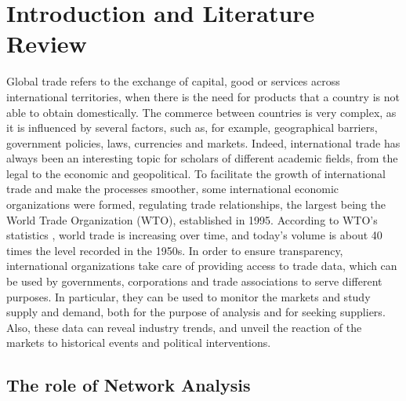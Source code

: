 \chapter{Introduction and Literature Review}

Global trade refers to the exchange of capital, good or services across international territories, when there is the need for products that a country is not able to obtain domestically. The commerce between countries is very complex, as it is influenced by several factors, such as, for example, geographical barriers, government policies, laws, currencies and markets. Indeed, international trade has always been an interesting topic for scholars of different academic fields, from the legal to the economic and geopolitical. To facilitate the growth of international trade and make the processes smoother, some international economic organizations were formed, regulating trade relationships, the largest being the World Trade Organization (WTO), established in 1995. According to WTO's statistics \cite{wto2022stats}, world trade is increasing over time, and today's volume is about 40 times the level recorded in the 1950s. In order to ensure transparency, international organizations take care of providing access to trade data, which can be used by governments, corporations and trade associations to serve different purposes. In particular, they can be used to monitor the markets and study supply and demand, both for the purpose of analysis and for seeking suppliers. Also, these data can reveal industry trends, and unveil the reaction of the markets to historical events and political interventions.

\section{The role of Network Analysis}


